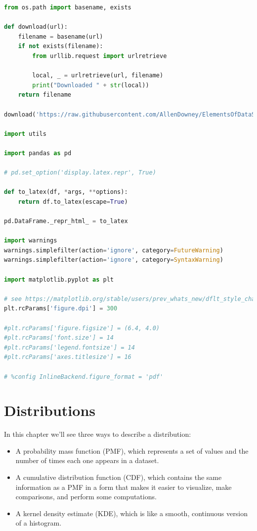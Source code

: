 \documentclass[
]{book}
\author{}
\date{}
\begin{document}
\frontmatter

\mainmatter
\begin{lstlisting}[language=Python]
from os.path import basename, exists

def download(url):
    filename = basename(url)
    if not exists(filename):
        from urllib.request import urlretrieve

        local, _ = urlretrieve(url, filename)
        print("Downloaded " + str(local))
    return filename

download('https://raw.githubusercontent.com/AllenDowney/ElementsOfDataScience/v1/utils.py')

import utils

import pandas as pd

# pd.set_option('display.latex.repr', True)

def to_latex(df, *args, **options):
    return df.to_latex(escape=True)

pd.DataFrame._repr_html_ = to_latex

import warnings
warnings.simplefilter(action='ignore', category=FutureWarning)
warnings.simplefilter(action='ignore', category=SyntaxWarning)

import matplotlib.pyplot as plt

# see https://matplotlib.org/stable/users/prev_whats_new/dflt_style_changes.html#figure-size-font-size-and-screen-dpi
plt.rcParams['figure.dpi'] = 300

#plt.rcParams['figure.figsize'] = (6.4, 4.0)
#plt.rcParams['font.size'] = 14
#plt.rcParams['legend.fontsize'] = 14
#plt.rcParams['axes.titlesize'] = 16

# %config InlineBackend.figure_format = 'pdf'
\end{lstlisting}

\chapter{Distributions}\label{distributions}

In this chapter we'll see three ways to describe a distribution:

\begin{itemize}
\item
  A probability mass function (PMF), which represents a set of values
  and the number of times each one appears in a dataset.
\item
  A cumulative distribution function (CDF), which contains the same
  information as a PMF in a form that makes it easier to visualize, make
  comparisons, and perform some computations.
\item
  A kernel density estimate (KDE), which is like a smooth, continuous
  version of a histogram.
\end{itemize}
\end{document}
